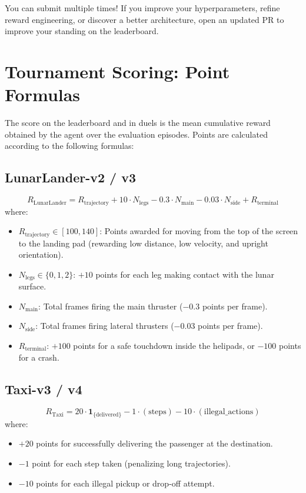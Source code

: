 \documentclass[11pt,a4paper]{article}
\begin{document}
\begin{infobox}
You can submit multiple times! If you improve your hyperparameters, refine reward engineering, or discover a better architecture, open an updated PR to improve your standing on the leaderboard.
\end{infobox}

\section{Tournament Scoring: Point Formulas}
\label{sec:scoring}

The score on the leaderboard and in duels is the mean cumulative reward obtained by the agent over the evaluation episodes. Points are calculated according to the following formulas:

\subsection{LunarLander-v2 / v3}
\[
R_{\mathrm{LunarLander}} = R_{\mathrm{trajectory}} + 10 \cdot N_{\mathrm{legs}} - 0.3 \cdot N_{\mathrm{main}} - 0.03 \cdot N_{\mathrm{side}} + R_{\mathrm{terminal}}
\]
where:
\begin{itemize}
    \item $R_{\mathrm{trajectory}} \in [100, 140]$: Points awarded for moving from the top of the screen to the landing pad (rewarding low distance, low velocity, and upright orientation).
    \item $N_{\mathrm{legs}} \in \{0, 1, 2\}$: $+10$ points for each leg making contact with the lunar surface.
    \item $N_{\mathrm{main}}$: Total frames firing the main thruster ($-0.3$ points per frame).
    \item $N_{\mathrm{side}}$: Total frames firing lateral thrusters ($-0.03$ points per frame).
    \item $R_{\mathrm{terminal}}$: $+100$ points for a safe touchdown inside the helipads, or $-100$ points for a crash.
\end{itemize}

\subsection{Taxi-v3 / v4}
\[
R_{\mathrm{Taxi}} = 20 \cdot \mathbf{1}_{\{\mathrm{delivered}\}} - 1 \cdot (\mathrm{steps}) - 10 \cdot (\mathrm{illegal\_actions})
\]
where:
\begin{itemize}
    \item $+20$ points for successfully delivering the passenger at the destination.
    \item $-1$ point for each step taken (penalizing long trajectories).
    \item $-10$ points for each illegal pickup or drop-off attempt.
\end{itemize}
\end{document}
